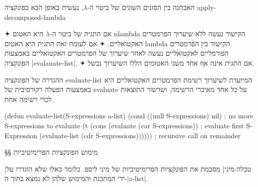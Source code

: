 האבחנה בין הסוגים השונים של ביטוי ה-$λ$, נעשית באופן הבא בפונקציה
apply-decomposed-lambda
\begin{itemize}
✦ אם התגית של ביטוי ה-$λ$ היא האטום nlambda הקישור נעשה ללא שיערוך הפרמטרים
האקטואליים.
✦ אם לעומת זאת התגית היא האטום lambda הקישור בין הפרמטרים הפורמליים לאקטואליים
נעשה לאחר שיערוך של הפרמטרים האקטואליים באמצעות הפונקציה
\E|evalauate-list|. ✦
אם התגית אינה אף אחד משני האטומים הללו השיערוך נכשל.
\end{itemize}

ההגדרה של הפונקציה evaluate-list המיועדת לשיערוך רשימת הפרמטרים האקטואליים היא
באמצעות הפעלה רקורסיבית של evaluate על כל אחד מאיברי הרשימה, ושרשור התוצאות
לכדי רשימה אחת.
\begin{KERNEL}
(defun evaluate-list(S-expressions a-list)
  (cond ((null S-expressions) nil) ; no more S-expressions to evaluate
    (t (cons
          (evaluate (car S-expressions)) ; evaluate first S-Expression
          (evaluate-list (cdr S-expressions)))))) ; recursive call on remainder
\end{KERNEL}

\vfill
\pagebreak[4]
§§ מימוש הפונקציות הפרימיטיביות

|טבלה:מיני| מסכמת את הפונקציות הפרימיטיביות של מיני ליספ. כלומר כאלו שלא
הוגדרו על ידי המתכנת והמימוש שלהן לא נמצא בתוך ה-\E|a-list|.

